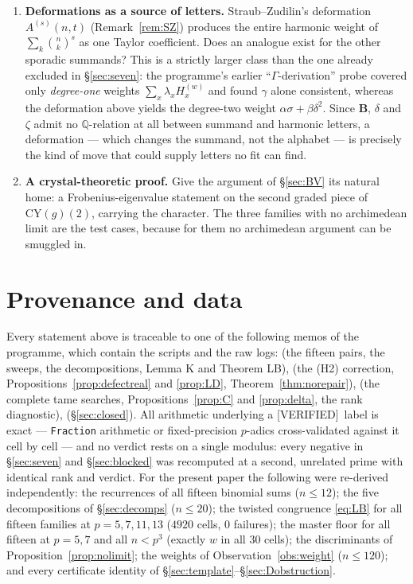 \documentclass[11pt,reqno]{amsart}
\theoremstyle{plain}
\theoremstyle{definition}
\theoremstyle{remark}
\newcommand{\Q}{\mathbb{Q}}
\newcommand{\bin}[2]{\binom{#1}{#2}}
\newcommand{\HH}[2]{H^{(#1)}_{#2}}
\newcommand{\Verified}{\textup{\textsf{[VERIFIED]}}}
\numberwithin{equation}{section}
\begin{document}
\begin{enumerate}[leftmargin=2em,label=\textbf{P\arabic*.}]
\item \textbf{Deformations as a source of letters.} Straub--Zudilin's deformation
  $A^{(s)}(n,t)$ (Remark~\ref{rem:SZ}) produces the entire harmonic weight of
  $\sum_k\bin nk^{s}$ as one Taylor coefficient. Does an analogue exist for the other
  sporadic summands? This is a strictly larger class than the one already excluded in
  \S\ref{sec:seven}: the programme's earlier ``$\Gamma$-derivation'' probe covered only
  \emph{degree-one} weights $\sum_x\lambda_x\HH wx$ and found $\gamma$ alone consistent,
  whereas the deformation above yields the degree-two weight
  $\alpha\sigma+\beta\delta^2$. Since $\mathbf B$, $\delta$ and $\zeta$ admit no
  $\Q$-relation at all between summand and harmonic letters, a deformation --- which
  changes the summand, not the alphabet --- is precisely the kind of move that could
  supply letters no fit can find.
\item \textbf{A crystal-theoretic proof.} Give the argument of \S\ref{sec:BV} its natural
  home: a Frobenius-eigenvalue statement on the second graded piece of
  $\mathrm{CY}(g)(2)$, carrying the character. The three families with no archimedean limit
  are the test cases, because for them no archimedean argument can be smuggled in.
\end{enumerate}

\section*{Provenance and data}

Every statement above is traceable to one of the following memos of the programme, which
contain the scripts and the raw logs: \cite{LBWGeneral} (the fifteen pairs, the sweeps, the
decompositions, Lemma K and Theorem LB), \cite{LemmaDCheck} (the (H2) correction,
Propositions~\ref{prop:defectreal} and \ref{prop:LD}, Theorem~\ref{thm:norepair}),
\cite{SporadicBare} (the complete tame searches, Propositions~\ref{prop:C} and
\ref{prop:delta}, the rank diagnostic), \cite{MinimalFormMemo} (\S\ref{sec:closed}). All
arithmetic underlying a \Verified\ label is exact --- \texttt{Fraction} arithmetic or
fixed-precision $p$-adics cross-validated against it cell by cell --- and no verdict rests
on a single modulus: every negative in \S\ref{sec:seven} and \S\ref{sec:blocked} was
recomputed at a second, unrelated prime with identical rank and verdict. For the present
paper the following were re-derived independently: the recurrences of all fifteen binomial
sums ($n\le12$); the five decompositions of \S\ref{sec:decomps} ($n\le20$); the twisted
congruence \eqref{eq:LB} for all fifteen families at $p=5,7,11,13$ ($4920$ cells, $0$
failures); the master floor for all fifteen at $p=5,7$ and all $n<p^3$ (exactly $w$ in all
$30$ cells); the discriminants of Proposition~\ref{prop:nolimit}; the weights of
Observation~\ref{obs:weight} ($n\le120$); and every certificate identity of
\S\ref{sec:template}--\S\ref{sec:Dobstruction}.
\end{document}
